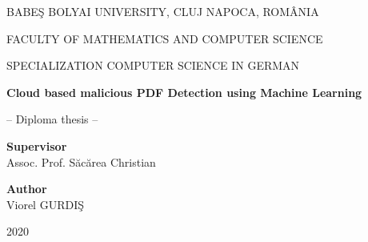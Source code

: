 \documentclass[a4paper,12pt,twoside]{report}
\begin{document}
\begin{titlepage}
	\sloppy
	\begin{center}
		BABE\c S BOLYAI UNIVERSITY, CLUJ NAPOCA, ROM\^ ANIA

		FACULTY OF MATHEMATICS AND COMPUTER SCIENCE

		SPECIALIZATION COMPUTER SCIENCE IN GERMAN

		\vspace{6cm}
		\Huge \textbf{Cloud based malicious PDF Detection using Machine Learning}

		\vspace{1cm}
		\normalsize -- Diploma thesis --
	\end{center}

	\vspace{5cm}
	\begin{flushleft}
		\Large{\textbf{Supervisor}}\\
		Assoc. Prof. S\u{a}c\u{a}rea Christian
	\end{flushleft}

	\begin{flushright}
		\Large{\textbf{Author}}\\
		Viorel GURDI\c S
	\end{flushright}

	\vspace{4cm}
	\begin{center}
		2020
	\end{center}
\end{titlepage}


\begin{abstract}
\end{abstract}


\tableofcontents

\newpage

\listoftables
\listoffigures

\newpage


\newpage












\end{document}

